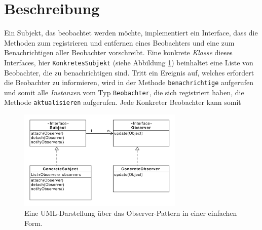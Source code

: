 \section{Beschreibung}

Ein Subjekt, das beobachtet werden möchte, implementiert ein Interface, dass die Methoden zum registrieren und entfernen eines Beobachters und eine zum Benachrichtigen aller Beobachter vorschreibt. Eine konkrete \textit{Klasse} dieses Interfaces, hier \texttt{KonkretesSubjekt} (siehe Abbildung \ref{observerdiagramm}) beinhaltet eine Liste von Beobachter, die zu benachrichtigen sind. Tritt ein Ereignis auf, welches erfordert die Beobachter zu informieren, wird in der Methode \texttt{benachrichtige} aufgerufen und somit alle \textit{Instanzen} vom Typ \texttt{Beobachter}, die sich registriert haben, die Methode \texttt{aktualisieren} aufgerufen. Jede Konkreter Beobachter kann somit


\begin{figure}[htbp]
\centering
\includegraphics[width=0.7\textwidth]{./paper/observer/observer}
\caption{Eine UML-Darstellung über das Observer-Pattern in einer einfachen Form.}
\label{observerdiagramm}
\end{figure} 
